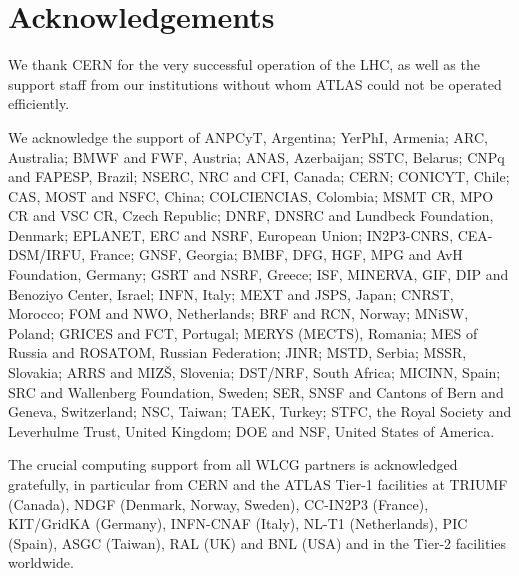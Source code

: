 \documentclass[11pt,a4paper,dvips]{article}
\begin{document}

\section{Acknowledgements}

We thank CERN for the very successful operation of the LHC, as well as the
support staff from our institutions without whom ATLAS could not be
operated efficiently.

We acknowledge the support of ANPCyT, Argentina; YerPhI, Armenia; ARC,
Australia; BMWF and FWF, Austria; ANAS, Azerbaijan; SSTC, Belarus; CNPq and FAPESP,
Brazil; NSERC, NRC and CFI, Canada; CERN; CONICYT, Chile; CAS, MOST and NSFC,
China; COLCIENCIAS, Colombia; MSMT CR, MPO CR and VSC CR, Czech Republic;
DNRF, DNSRC and Lundbeck Foundation, Denmark; EPLANET, ERC and NSRF, European Union;
IN2P3-CNRS, CEA-DSM/IRFU, France; GNSF, Georgia; BMBF, DFG, HGF, MPG and AvH
Foundation, Germany; GSRT and NSRF, Greece; ISF, MINERVA, GIF, DIP and Benoziyo Center,
Israel; INFN, Italy; MEXT and JSPS, Japan; CNRST, Morocco; FOM and NWO,
Netherlands; BRF and RCN, Norway; MNiSW, Poland; GRICES and FCT, Portugal; MERYS
(MECTS), Romania; MES of Russia and ROSATOM, Russian Federation; JINR; MSTD,
Serbia; MSSR, Slovakia; ARRS and MIZ\v{S}, Slovenia; DST/NRF, South Africa;
MICINN, Spain; SRC and Wallenberg Foundation, Sweden; SER, SNSF and Cantons of
Bern and Geneva, Switzerland; NSC, Taiwan; TAEK, Turkey; STFC, the Royal
Society and Leverhulme Trust, United Kingdom; DOE and NSF, United States of
America.

The crucial computing support from all WLCG partners is acknowledged
gratefully, in particular from CERN and the ATLAS Tier-1 facilities at
TRIUMF (Canada), NDGF (Denmark, Norway, Sweden), CC-IN2P3 (France),
KIT/GridKA (Germany), INFN-CNAF (Italy), NL-T1 (Netherlands), PIC (Spain),
ASGC (Taiwan), RAL (UK) and BNL (USA) and in the Tier-2 facilities
worldwide.
\end{document}

